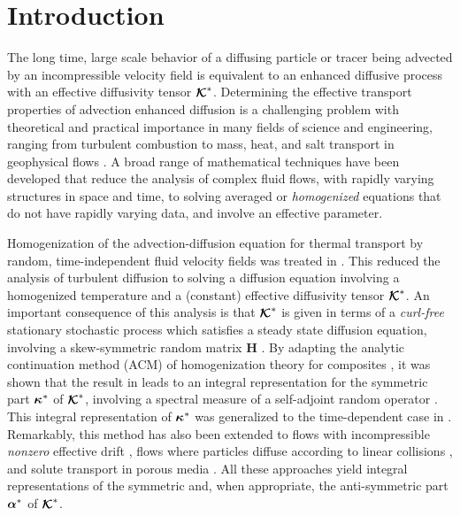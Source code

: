 \documentclass[11pt]{amsart}
\newcommand{\Hb}{\mathbf{H}}
\newcommand\Kbc{\mbox{\boldmath${\mathcal{K}}$}}
\newcommand\balpha{\mbox{\boldmath${\alpha}$}}
\newcommand\bkappa{\mbox{\boldmath${\kappa}$}}
\begin{document}
\section{Introduction}\label{sec:Introduction}
%
The long time, large scale behavior of a diffusing particle   
or tracer being advected by an incompressible velocity field 
is equivalent to an enhanced diffusive process \cite{Taylor:PRSL:196} 
with an effective diffusivity tensor $\Kbc^*$.
Determining the effective transport properties of advection enhanced
diffusion is a challenging problem with theoretical and practical 
importance in many fields of science and engineering,
ranging from turbulent combustion to mass, heat, and salt transport in
geophysical flows \cite{Moffatt:RPP:621}. A broad range of
mathematical techniques have been developed that reduce the analysis
of complex fluid flows, with rapidly varying structures in space and
time, to solving averaged or \textit{homogenized} equations that do
not have rapidly varying data, and involve an effective parameter.




Homogenization of the advection-diffusion equation for thermal
transport by random, time-independent fluid velocity fields was
treated in \cite{McLaughlin:SIAM_JAM:780}. This 
reduced the analysis of turbulent diffusion to solving a
diffusion equation involving a homogenized temperature and a
(constant) effective diffusivity tensor $\Kbc^*$. An important
consequence of this analysis is that $\Kbc^*$ is given in terms  
of a \emph{curl-free} stationary stochastic process which satisfies a
steady state diffusion equation, involving a skew-symmetric random
matrix $\Hb$ \cite{Avellaneda:CMP-339,Avellaneda:PRL-753}. By adapting
the analytic continuation method (ACM) of homogenization theory for
composites \cite{Golden:CMP-473}, it was shown that the result in
\cite{McLaughlin:SIAM_JAM:780} leads to an integral
representation for the symmetric part $\bkappa^*$ of $\Kbc^*$,
involving a spectral measure of a self-adjoint random
operator \cite{Avellaneda:CMP-339,Avellaneda:PRL-753}. This integral
representation of $\bkappa^*$ was generalized to the time-dependent
case in \cite{Avellaneda:PRE:3249,Biferale:PF:2725}. Remarkably, this 
method has also been extended to flows with incompressible
\emph{nonzero} effective drift \cite{Pavliotis:PHD_Thesis}, flows
where particles diffuse according to linear collisions
\cite{Pavliotis:IMAJAM:951}, and solute transport in porous media
\cite{Bhattacharya:AAP:1999:951}. All these approaches yield integral
representations of the symmetric and, when appropriate, the
anti-symmetric part $\balpha^*$ of $\Kbc^*$. 
\end{document}
